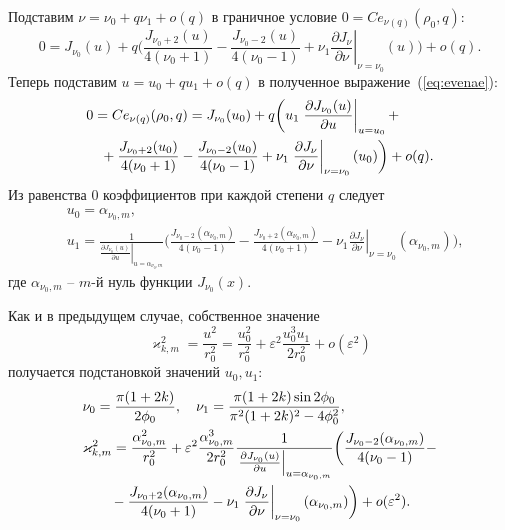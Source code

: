 Подставим  $\nu = \nu_0 + q \nu_1 + o(q)$  в граничное условие $0 = Ce_{\nu(q)}(\rho_0, q)$:
\begin{equation}
    0 = 
    J_{\nu_0}(u) + q \biggl( 
    \frac{J_{\nu_0+2}(u)}{4(\nu_0+1)}  - \frac{J_{\nu_0-2}(u)}{4(\nu_0-1)}
    + \nu_1 \left.\frac{\partial J_\nu}{\partial \nu}\right|_{\nu=\nu_0}(u)
    \biggr) + o(q).\label{eq:evenae}
\end{equation}
Теперь подставим $u = u_0 + q u_1 + o(q)$  в полученное выражение~(\ref{eq:evenae}):
\begin{align*}
    &0 =  Ce_{\nu(q)}(\rho_0, q) = 
    J_{\nu_0}(u_0) + q \biggl( 
    u_1 \left.\frac{\partial J_{\nu_0} (u)}{\partial u}\right|_{u=u_0} +  \notag \\
  &\quad{}  + \frac{J_{\nu_0+2}(u_0)}{4(\nu_0+1)} - \frac{J_{\nu_0-2}(u_0)}{4(\nu_0-1)}    + \nu_1 \left.\frac{\partial J_\nu}{\partial \nu}\right|_{\nu=\nu_0}(u_0)
    \biggr) + o(q).
\end{align*}
Из равенства $0$ коэффициентов при каждой степени $q$ следует
\begin{align*}
&u_0 = \alpha_{\nu_0, m}, \\
&u_1 = \frac{1}{\left.\frac{\partial J_{\nu_0} (u)}{\partial u}\right|_{u=\alpha_{\nu_0, m}}} 
\biggl(
\frac{J_{\nu_0-2}(\alpha_{\nu_0, m})}{4(\nu_0-1)} - \frac{J_{\nu_0+2}(\alpha_{\nu_0, m})}{4(\nu_0+1)}
 - \nu_1 \left.\frac{\partial J_\nu}{\partial \nu}\right|_{\nu=\nu_0}(\alpha_{\nu_0, m})
\biggr),
\end{align*}
где $\alpha_{\nu_0, m}$ -- $m$-й нуль функции $J_{\nu_0}(x)$.  

Как и в предыдущем случае, собственное значение
$$\varkappa_{k, m}^2 = \frac{u^2}{r_0^2} = \frac{u_0^2}{r_0^2} + \varepsilon^2 \frac{u_0^3 u_1}{2r_0^2} + o(\varepsilon^2)$$ получается подстановкой значений $u_0, u_1$:
\begin{align*}
&\nu_0 = \frac{\pi (1 + 2 k)}{2 \phi_0}, \quad \nu_1 = \frac{\pi (1+2k) \sin 2\phi_0}{\pi^2(1+2k)^2 - 4\phi_0^2},\\
&\varkappa_{k, m}^2 = \frac{\alpha_{\nu_0, m}^2}{r_0^2} + \varepsilon^2 \frac{\alpha_{\nu_0, m}^3}{2r_0^2} \frac{1}{\left.\frac{\partial J_{\nu_0} (u)}{\partial u}\right|_{u=\alpha_{\nu_0, m}}}\biggl(
\frac{J_{\nu_0-2}(\alpha_{\nu_0, m})}{4(\nu_0-1)} - \notag\\
&\qquad{} - \frac{J_{\nu_0+2}(\alpha_{\nu_0, m})}{4(\nu_0+1)}    - \nu_1 \left.\frac{\partial J_\nu}{\partial \nu}\right|_{\nu=\nu_0}(\alpha_{\nu_0, m})
\biggr) + o(\varepsilon^2).
\end{align*}

